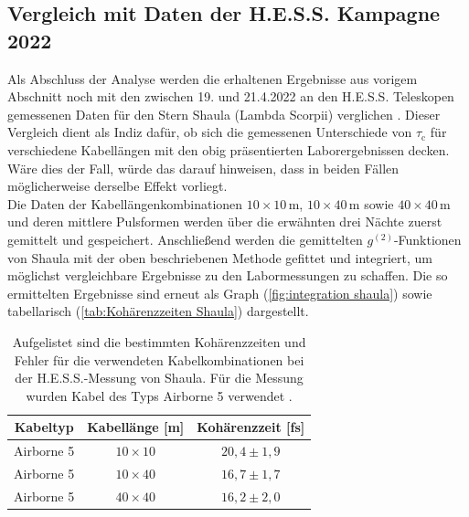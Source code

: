 \subsection{Vergleich mit Daten der H.E.S.S. Kampagne 2022}
\label{ssec:Vergleich mit Hess}
Als Abschluss der Analyse werden die erhaltenen Ergebnisse aus vorigem Abschnitt noch mit den zwischen 19. und 21.4.2022 an den H.E.S.S. Teleskopen gemessenen Daten für den Stern Shaula (Lambda Scorpii) verglichen \cite{zmijaFirstIntensityInterferometry2023}. 
Dieser Vergleich dient als Indiz dafür, ob sich die gemessenen Unterschiede von $\tau_{\mathrm{c}}$ für verschiedene Kabellängen mit den obig präsentierten Laborergebnissen decken. 
Wäre dies der Fall, würde das darauf hinweisen, dass in beiden Fällen möglicherweise derselbe Effekt vorliegt. \\ 
Die Daten der Kabellängenkombinationen $10 \times 10\,\mathrm{m}$, $10 \times 40\,\mathrm{m}$ sowie $40 \times 40\,\mathrm{m}$ und deren mittlere Pulsformen werden über die erwähnten drei Nächte zuerst gemittelt und gespeichert. 
Anschließend werden die gemittelten $g^{(2)}$-Funktionen von Shaula mit der oben beschriebenen Methode gefittet und integriert, um möglichst vergleichbare Ergebnisse zu den Labormessungen zu schaffen. 
Die so ermittelten Ergebnisse sind erneut als Graph (\autoref{fig:integration shaula}) sowie tabellarisch (\autoref{tab:Kohärenzzeiten Shaula}) dargestellt. 
\begin{table}[h]
    \centering
    \begin{tabular}{|c|c|c|} \hline
        Kabeltyp    & Kabellänge [m] & Kohärenzzeit [fs]  \\\hline
        Airborne 5  & $10\times 10$  & $20{,}4 \pm 1{,}9$ \\\hline
        Airborne 5  & $10\times 40$  & $16{,}7 \pm 1{,}7$ \\\hline
        Airborne 5  & $40\times 40$  & $16{,}2 \pm 2{,}0$ \\\hline
    \end{tabular}
    \caption{Aufgelistet sind die bestimmten Kohärenzzeiten und Fehler für die verwendeten Kabelkombinationen bei der H.E.S.S.-Messung von Shaula. Für die Messung wurden Kabel des Typs Airborne 5 verwendet \cite{zmijaFirstIntensityInterferometry2023}.}
    \label{tab:Kohärenzzeiten Shaula}
\end{table}
